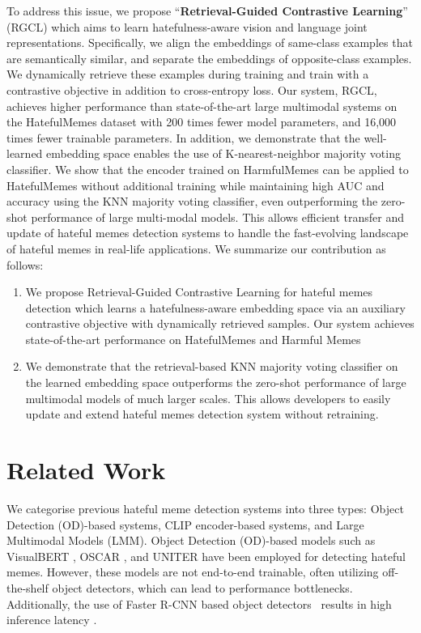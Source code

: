 \documentclass[11pt]{article}
\begin{document}
To address this issue, we propose ``\textbf{Retrieval-Guided Contrastive Learning}'' (RGCL) which aims to learn hatefulness-aware vision and language joint representations. Specifically, we align the embeddings of same-class examples that are semantically similar, and separate the embeddings of opposite-class examples. We dynamically retrieve these examples during training and train with a contrastive objective in addition to cross-entropy loss. Our system, RGCL, achieves higher performance than state-of-the-art large multimodal systems on the HatefulMemes dataset with 200 times fewer model parameters, and 16,000 times fewer trainable parameters. In addition, we demonstrate that the well-learned embedding space enables the use of K-nearest-neighbor majority voting classifier. We show that the encoder trained on HarmfulMemes can be applied to HatefulMemes without additional training while maintaining high AUC and accuracy using the KNN majority voting classifier, even outperforming the zero-shot performance of large multi-modal models. This allows efficient transfer and update of hateful memes detection systems to handle the fast-evolving landscape of hateful memes in real-life applications.
We summarize our contribution as follows:
\begin{enumerate}
    \item We propose Retrieval-Guided Contrastive Learning for hateful memes detection which learns a hatefulness-aware embedding space via an auxiliary contrastive objective with dynamically retrieved samples. Our system achieves state-of-the-art performance on HatefulMemes and Harmful Memes
\item We demonstrate that the retrieval-based KNN majority voting classifier on the learned embedding space outperforms the zero-shot performance of large multimodal models of much larger scales. This allows developers to easily update and extend hateful memes detection system without retraining. 
\end{enumerate}

\section{Related Work}
We categorise previous hateful meme detection systems into three types: Object Detection (OD)-based systems, CLIP encoder-based systems, and Large Multimodal Models (LMM).
Object Detection (OD)-based models such as VisualBERT \cite{VisualBert2019}, OSCAR \cite{li2020oscar}, and UNITER \cite{Uniter2019} have been employed for detecting hateful memes. However, these models are not end-to-end trainable, often utilizing off-the-shelf object detectors, which can lead to performance bottlenecks. Additionally, the use of Faster R-CNN \cite{fater_RCNN_2015} based object detectors~\cite{Anderson2017up-down, vinVL2021} results in high inference latency \cite{Kim_ViLT2021}.
\end{document}
